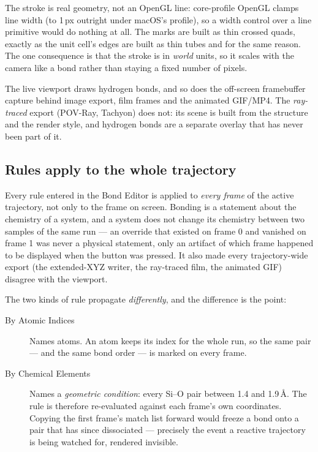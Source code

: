 The stroke is real geometry, not an OpenGL line: core-profile OpenGL clamps
line width (to 1\,px outright under macOS's profile), so a width control
over a line primitive would do nothing at all. The marks are built as thin
crossed quads, exactly as the unit cell's edges are built as thin tubes and
for the same reason. The one consequence is that the stroke is in
\emph{world} units, so it scales with the camera like a bond rather than
staying a fixed number of pixels.

The live viewport draws hydrogen bonds, and so does the off-screen
framebuffer capture behind image export, film frames and the animated
GIF/MP4. The \emph{ray-traced} export (POV-Ray, Tachyon) does not: its
scene is built from the structure and the render style, and hydrogen bonds
are a separate overlay that has never been part of it.

\subsection{Rules apply to the whole trajectory}
\label{sec:bond-rules-trajectory}

Every rule entered in the Bond Editor is applied to \emph{every frame} of
the active trajectory, not only to the frame on screen. Bonding is a
statement about the chemistry of a system, and a system does not change
its chemistry between two samples of the same run --- an override that
existed on frame 0 and vanished on frame 1 was never a physical statement,
only an artifact of which frame happened to be displayed when the button
was pressed. It also made every trajectory-wide export (the extended-XYZ
writer, the ray-traced film, the animated GIF) disagree with the viewport.

The two kinds of rule propagate \emph{differently}, and the difference is
the point:

\begin{description}
  \item[By Atomic Indices] Names atoms. An atom keeps its index for the
    whole run, so the same pair --- and the same bond order --- is marked
    on every frame.
  \item[By Chemical Elements] Names a \emph{geometric condition}: every
    Si--O pair between 1.4 and 1.9\,\AA{}. The rule is therefore
    re-evaluated against each frame's own coordinates. Copying the first
    frame's match list forward would freeze a bond onto a pair that has
    since dissociated --- precisely the event a reactive trajectory is
    being watched for, rendered invisible.
\end{description}

